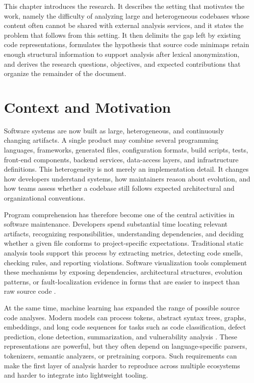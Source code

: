 This chapter introduces the research. It describes the setting that motivates
the work, namely the difficulty of analyzing large and heterogeneous codebases
whose content often cannot be shared with external analysis services, and it
states the problem that follows from this setting. It then delimits the gap left
by existing code representations, formulates the hypothesis that source code
minimaps retain enough structural information to support analysis after lexical
anonymization, and derives the research questions, objectives, and expected
contributions that organize the remainder of the document.

\section{Context and Motivation}

Software systems are now built as large, heterogeneous, and continuously
changing artifacts. A single product may combine several programming languages,
frameworks, generated files, configuration formats, build scripts, tests,
front-end components, backend services, data-access layers, and infrastructure
definitions. This heterogeneity is not merely an implementation detail. It
changes how developers understand systems, how maintainers reason about
evolution, and how teams assess whether a codebase still follows expected
architectural and organizational conventions.

Program comprehension has therefore become one of the central activities in
software maintenance. Developers spend substantial time locating relevant
artifacts, recognizing responsibilities, understanding dependencies, and
deciding whether a given file conforms to project-specific expectations.
Traditional static analysis tools support this process by extracting metrics,
detecting code smells, checking rules, and reporting violations. Software
visualization tools complement these mechanisms by exposing dependencies,
architectural structures, evolution patterns, or fault-localization evidence in
forms that are easier to inspect than raw source code
\cite{pinzger2008tool,novais2013sourceminer,kobayashi2013sarf,qayum2022finecodeanalyzer,sun2024sflvis}.

At the same time, machine learning has expanded the range of possible source
code analyses. Modern models can process tokens, abstract syntax trees, graphs,
embeddings, and long code sequences for tasks such as code classification,
defect prediction, clone detection, summarization, and vulnerability analysis
\cite{allamanis2018survey,alon2019code2vec,feng2020codebert,guo2021graphcodebert,yang2025sparsecoder}.
These representations are powerful, but they often depend on language-specific
parsers, tokenizers, semantic analyzers, or pretraining corpora. Such
requirements can make the first layer of analysis harder to reproduce across
multiple ecosystems and harder to integrate into lightweight tooling.

